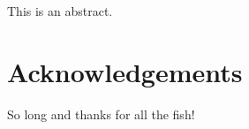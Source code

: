 \documentclass[10pt,leftblank,twoside]{mitthesis}
\begin{document}
\cleardoublepage
\setcounter{savepage}{\thepage}
\begin{abstractpage}

This is an abstract.

\end{abstractpage}

\cleardoublepage

\section*{Acknowledgements}

So long and thanks for all the fish!

\newcommand{\edge}[3]{#1 \xrightarrow{#3} #2}
\newcommand{\conedge}[3]{#1 \xRightarrow{#3} #2}
\newcommand{\gammabar}{\bar{\gamma}}
\newcommand{\obs}{\psi}
\newcommand{\assign}{\xi}

\newcommand{\finalversion}[1]{}

\newtheorem{theorem}{Theorem}[]
\newtheorem{corollary}{Corollary}[theorem]
\newtheorem{lemma}[theorem]{Lemma}

\newtheorem{transformation}{Transformation}

\theoremstyle{definition}
\newtheorem{defn}{Definition}

\theoremstyle{definition}
\newtheorem{example}{Example}

\pagestyle{plain}

\tableofcontents
\newpage
\listoffigures
\newpage
\renewcommand\listoflistingscaption{List of source codes}
\listoflistings
\newpage
\listoftables
\end{document}

